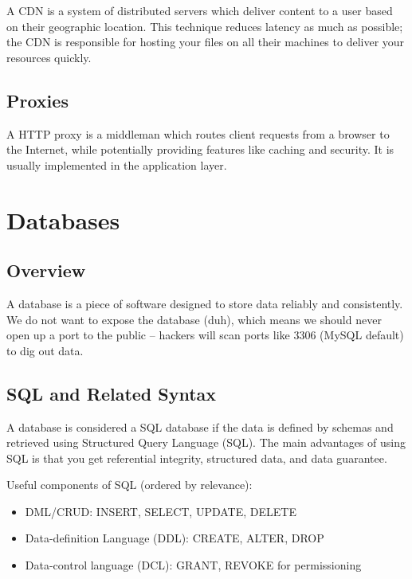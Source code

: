 \documentclass{report}
\newcommand{\npar}{\par\noindent}
\newcommand{\vpar}{\vspace{1em}\npar}
\begin{document}
\par A CDN is a system of distributed servers which deliver content to a user based on their geographic location. This technique reduces latency as much as possible; the CDN is responsible for hosting your files on all their machines to deliver your resources quickly.

\section{Proxies}

\par A HTTP proxy is a middleman which routes client requests from a browser to the Internet, while potentially providing features like caching and security. It is usually implemented in the application layer.

\chapter{Databases}

\section{Overview}

\par A database is a piece of software designed to store data reliably and consistently. We do not want to expose the database (duh), which means we should never open up a port to the public -- hackers will scan ports like 3306 (MySQL default) to dig out data.

\section{SQL and Related Syntax}

\par A database is considered a SQL database if the data is defined by schemas and retrieved using Structured Query Language (SQL). The main advantages of using SQL is that you get referential integrity, structured data, and data guarantee.

\vpar Useful components of SQL (ordered by relevance):

\begin{itemize}
    \item DML/CRUD: INSERT, SELECT, UPDATE, DELETE
    \item Data-definition Language (DDL): CREATE, ALTER, DROP
    \item Data-control language (DCL): GRANT, REVOKE for permissioning
\end{itemize}
\end{document}
